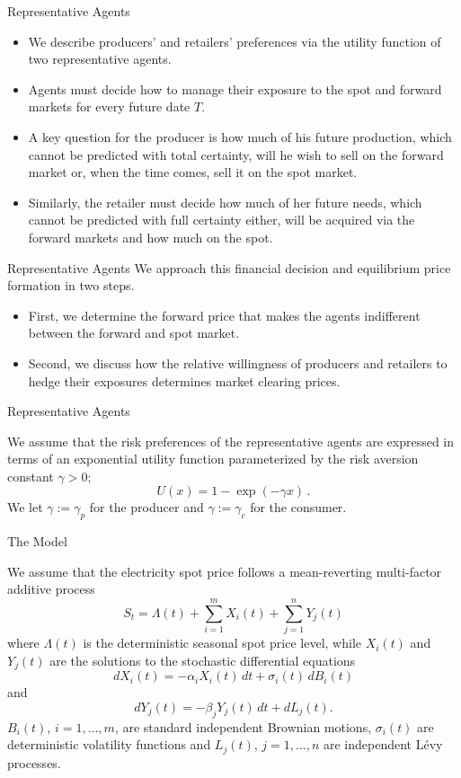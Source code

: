 {Representative Agents}

\begin{itemize}
\item<1-> We describe producers' and retailers'
preferences via the utility function of two representative agents.
\item<2-> Agents
must decide how to manage their exposure to the spot and forward
markets for every future date $T$.
\item<3->
A key question for the producer
is how much of his future production, which cannot be predicted with
total certainty, will he wish to sell on the forward market or, when
the time comes, sell it on the spot market.
\item<4-> Similarly, the retailer
must decide how much of her future needs, which cannot be predicted
with full certainty either, will be acquired via the forward markets
and how much on the spot.
\end{itemize}

{Representative Agents}
We approach this financial decision and
equilibrium price formation in two steps.

\begin{itemize}
\item<1-> First, we determine the
forward price that makes the agents indifferent between the forward
and spot market.
\item<2-> Second, we discuss how the relative willingness
of producers and retailers to hedge their exposures determines
market clearing prices.
\end{itemize}

{Representative Agents}

We assume that the risk preferences of the representative agents are
expressed in terms of an exponential utility function parameterized
by the risk aversion constant $\gamma>0$;
$$
U(x)=1-\exp(-\gamma x)\,.
$$
We let $\gamma:=\gamma_p$ for the producer and $\gamma:=\gamma_c$
for the consumer.

{The Model}

We assume that the electricity spot price follows a
mean-reverting multi-factor additive process
\begin{equation}\label{equation for additive stock price}
S_t=\Lambda(t)+\sum_{i=1}^mX_i(t)+\sum_{j=1}^nY_j(t)
\end{equation}
where $\Lambda(t)$ is the deterministic seasonal spot price level,
while $X_i(t)$ and $Y_j(t)$ are the solutions to the stochastic
differential equations
\begin{equation}
dX_i(t)=-\alpha_i X_i(t)\,dt+\sigma_i(t)\,dB_i(t)
\end{equation}
and
\begin{equation}
dY_j(t)=-\beta_j Y_j(t)\,dt+dL_j(t).
\end{equation}
$B_i(t)$, $i=1,\ldots,m$, are standard independent Brownian
motions, $\sigma_i(t)$ are deterministic volatility functions
and $L_j(t)$, $j=1,\ldots,n$ are independent L\'evy
processes.

